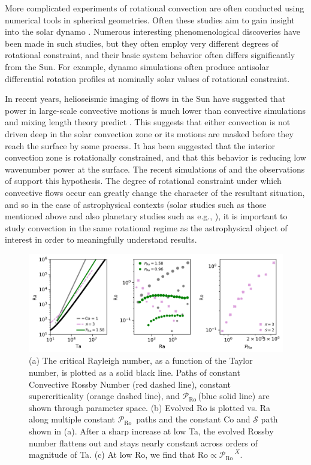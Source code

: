 \documentclass[twocolumn, amsmath, amsfonts, amssymb]{aastex62}
\newcommand{\pro}{\ensuremath{\mathcal{P}_{\text{Ro}}\,}}
\begin{document}
More complicated experiments of rotational convection are often conducted
using numerical tools in spherical geometries. Often these studies aim to
gain insight into the solar dynamo \citep{glatzmaier&gilman1982, busse2002, brown&all2008,
brown&all2010, brown&all2011, augustson&all2012, guerrero&all2013, kapyla&all2014}.
Numerous interesting phenomenological discoveries have been made in such studies,
but they often employ very different degrees of rotational constraint, and their
basic system behavior often differs significantly from the Sun. For example, 
dynamo simulations often produce antisolar differential rotation profiles at
nominally solar values of rotational constraint.

In recent years, helioseismic imaging of flows in the Sun have suggested that
power in large-scale convective motions is much lower than convective simulations
and mixing length theory predict \citep{hanasoge&all2012, greer&all2015L}.
This suggests that either convection is not driven deep in the solar convection
zone or its motions are masked before they reach the surface by some process.
It has been suggested that the
interior convection zone is rotationally constrained, and that this behavior is
reducing low wavenumber power at the surface. The recent simulations of
\cite{featherstone&hindman2016} and the observations of \cite{greer&all2016} 
support this hypothesis.  The degree of rotational constraint
under which convective flows occur can greatly change the character of the
resultant situation, and so in the case of astrophysical contexts (solar studies
such as those mentioned above and also planetary studies such as e.g., 
\cite{soderlund&all2015, aurnou&king2017}), it is important to study convection in the same
rotational regime as the astrophysical object of interest in order to meaningfully
understand results.

\begin{figure}[t!]
\includegraphics[width=\textwidth]{./figs/parameter_space.png}
\caption{(a) The critical Rayleigh number, as a function of the Taylor number, 
is plotted as a solid black line. Paths of constant Convective Rossby Number
(red dashed line), constant supercriticality (orange dashed line), and 
\pro (blue solid line) are shown through parameter space. (b) Evolved
Ro is plotted vs. Ra along multiple constant \pro
paths and the constant Co and $\mathcal{S}$ path shown in (a).
After a sharp increase at low Ta, the evolved Rossby number flattens
out and stays nearly constant across orders of magnitude of Ta.
(c) At low Ro, we find that $\text{Ro} \propto \pro^X$.
\label{fig:parameter_space} }
\end{figure}
\end{document}
